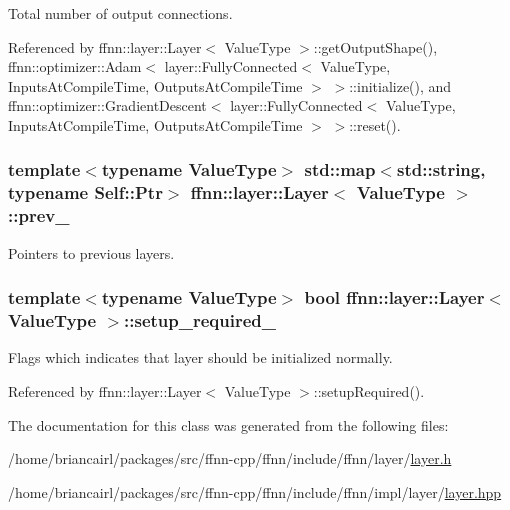 Total number of output connections. 



Referenced by ffnn\-::layer\-::\-Layer$<$ Value\-Type $>$\-::get\-Output\-Shape(), ffnn\-::optimizer\-::\-Adam$<$ layer\-::\-Fully\-Connected$<$ Value\-Type, Inputs\-At\-Compile\-Time, Outputs\-At\-Compile\-Time $>$ $>$\-::initialize(), and ffnn\-::optimizer\-::\-Gradient\-Descent$<$ layer\-::\-Fully\-Connected$<$ Value\-Type, Inputs\-At\-Compile\-Time, Outputs\-At\-Compile\-Time $>$ $>$\-::reset().

\hypertarget{classffnn_1_1layer_1_1_layer_abe139156722efe30288b00becbd52cb9}{
\subsubsection[{prev\-\_\-}]{\setlength{\rightskip}{0pt plus 5cm}template$<$typename Value\-Type$>$ std\-::map$<$std\-::string, typename {\bf Self\-::\-Ptr}$>$ {\bf ffnn\-::layer\-::\-Layer}$<$ Value\-Type $>$\-::prev\-\_\-\hspace{0.3cm}{\ttfamily [protected]}}}\label{classffnn_1_1layer_1_1_layer_abe139156722efe30288b00becbd52cb9}


Pointers to previous layers. 

\hypertarget{classffnn_1_1layer_1_1_layer_a1a366d73e2b1ead280a6956c85ea56cb}{
\subsubsection[{setup\-\_\-required\-\_\-}]{\setlength{\rightskip}{0pt plus 5cm}template$<$typename Value\-Type$>$ bool {\bf ffnn\-::layer\-::\-Layer}$<$ Value\-Type $>$\-::setup\-\_\-required\-\_\-\hspace{0.3cm}{\ttfamily [protected]}}}\label{classffnn_1_1layer_1_1_layer_a1a366d73e2b1ead280a6956c85ea56cb}


Flags which indicates that layer should be initialized normally. 



Referenced by ffnn\-::layer\-::\-Layer$<$ Value\-Type $>$\-::setup\-Required().



The documentation for this class was generated from the following files\-:\begin{DoxyCompactItemize}
\item 
/home/briancairl/packages/src/ffnn-\/cpp/ffnn/include/ffnn/layer/\hyperlink{layer_8h}{layer.\-h}\item 
/home/briancairl/packages/src/ffnn-\/cpp/ffnn/include/ffnn/impl/layer/\hyperlink{layer_8hpp}{layer.\-hpp}\end{DoxyCompactItemize}
